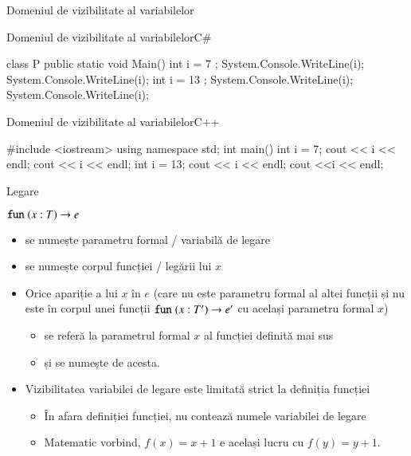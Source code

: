 \documentclass[xcolor=pdftex,romanian,colorlinks]{beamer}
\begin{document}
\begin{section}{Domeniul de vizibilitate al variabilelor}

\begin{frame}[fragile]{Domeniul de vizibilitate al variabilelor}{C\#}
\begin{asciics}
class P {
    public static void Main() {
        int i = 7 ;
        System.Console.WriteLine(i);
        {
          System.Console.WriteLine(i);
          int i = 13 ;
          System.Console.WriteLine(i);
        }
        System.Console.WriteLine(i);
    }
}
\end{asciics}
\end{frame}

\begin{frame}[fragile]{Domeniul de vizibilitate al variabilelor}{C++}
\begin{asciics}
#include <iostream>
using namespace std;
int main()  {
  int i = 7;
  cout << i << endl;
  {
     cout << i << endl;
     int i = 13;
     cout << i << endl;
  }
  cout <<i << endl;
}
\end{asciics}
\end{frame}



\begin{frame}{Legare}
\begin{block}{ $\mathrel{\text{\ttfamily fun}} (x:T) \rightarrow e$}
\begin{itemize}
\item {} se numește parametru formal / variabilă de legare
\item {} se numește corpul funcției /  legării lui $x$
\item Orice apariție a lui $x$ în $e$ ({\small \color{gray}care nu este parametru formal al altei funcții
 și nu este în corpul unei funcții $\mathrel{\text{\ttfamily fun}} (x:T') \rightarrow e'$ cu același parametru formal $x$})
\begin{itemize}
\item se referă la parametrul formal $x$ al funcției definită mai sus 
\item și se numește  de acesta.
\end{itemize}
%
\item Vizibilitatea variabilei de legare este limitată strict la definiția funcției
\begin{itemize}
 \item În afara definiției funcției, nu contează numele variabilei de legare
  \item Matematic vorbind, $f(x) = x + 1$ e același lucru cu $f(y) = y + 1$.
\end{itemize}
\end{itemize}
\end{block}
\end{frame}


\end{section}
\end{document}
